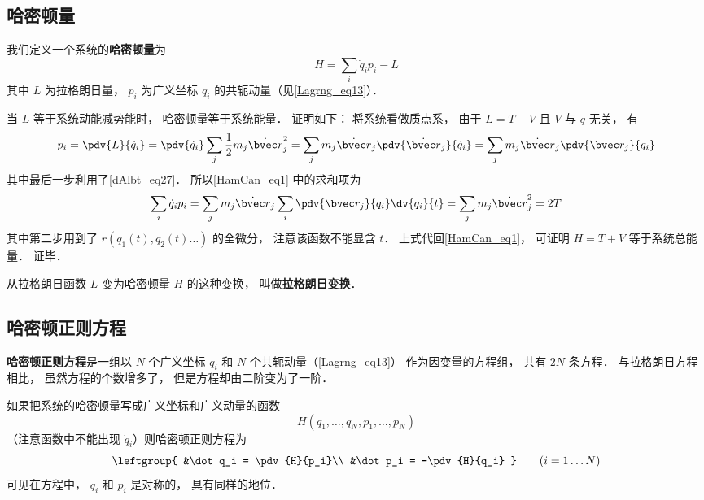 

\subsection{哈密顿量}
我们定义一个系统的\textbf{哈密顿量}为
\begin{equation}\label{HamCan_eq1}
H = \sum_i \dot q_i p_i - L
\end{equation}
其中 $L$ 为拉格朗日量， $p_i$ 为广义坐标 $q_i$ 的共轭动量（见\autoref{Lagrng_eq13}）．

当 $L$ 等于系统动能减势能时， 哈密顿量等于系统能量． 证明如下： 将系统看做质点系， 由于 $L = T - V$ 且 $V$ 与 $\dot q$ 无关， 有
\begin{equation}
p_i = \pdv{L}{\dot q_i} = \pdv{\dot q_i} \sum_j \frac12 m_j \dot{\bvec r}_j^2
= \sum_j m_j \dot{\bvec r}_j \pdv{\dot{\bvec r}_j}{\dot q_i}
= \sum_j m_j \dot{\bvec r}_j  \pdv{\bvec r_j}{q_i}
\end{equation}
其中最后一步利用了\autoref{dAlbt_eq27}． 所以\autoref{HamCan_eq1} 中的求和项为
\begin{equation}
 \sum_i \dot q_i p_i = \sum_j m_j \dot{\bvec r}_j \sum_i \pdv{\bvec r_j}{q_i}\dv{q_i}{t}
= \sum_j m_j \dot{\bvec r}_j^2 = 2T
\end{equation}
其中第二步用到了 $r(q_1(t), q_2(t) \dots)$ 的全微分， 注意该函数不能显含 $t$．%
 上式代回\autoref{HamCan_eq1}， 可证明 $H = T + V$ 等于系统总能量． 证毕．

从拉格朗日函数 $L$ 变为哈密顿量 $H$ 的这种变换， 叫做\textbf{拉格朗日变换}．

\subsection{哈密顿正则方程}
\textbf{哈密顿正则方程}是一组以 $N$ 个广义坐标 $q_i$ 和 $N$ 个共轭动量（\autoref{Lagrng_eq13}） 作为因变量的方程组， 共有 $2N$ 条方程． 与拉格朗日方程相比， 虽然方程的个数增多了， 但是方程却由二阶变为了一阶．

如果把系统的哈密顿量写成广义坐标和广义动量的函数
\begin{equation}
H(q_1,\dots, q_N, p_1,\dots, p_N)
\end{equation}
（注意函数中不能出现 $\dot q_i$）则哈密顿正则方程为
\begin{equation}
\leftgroup{
&\dot q_i = \pdv{H}{p_i}\\
&\dot p_i = -\pdv{H}{q_i}
}
\qquad (i = 1\dots N)
\end{equation}
可见在方程中， $q_i$ 和 $p_i$ 是对称的， 具有同样的地位．


